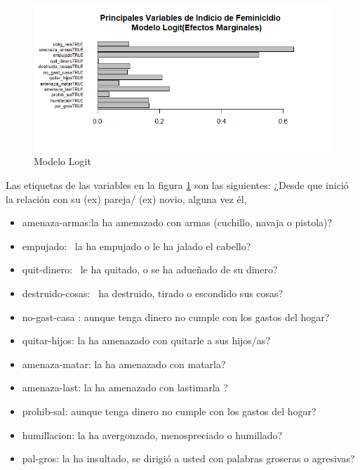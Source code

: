 \documentclass[11pt,letter]{article}
\begin{document}
\begin{figure}[!htp]
\includegraphics[scale=0.7]{log2.png}
\caption{Modelo Logit}
\label{f1_log}
\end{figure}

Las etiquetas de las variables en la figura \ref{f1_log} son las siguientes:
¿Desde que inició la relación con su (ex) pareja/ (ex) novio, alguna vez él,						

\begin{itemize}
    item oblig-rela:  ha usado la fuerza física para obligarla a tener relaciones sexuales?
    \item amenaza-armas:la ha amenazado con armas (cuchillo, navaja o pistola)?
    \item empujado:  la ha empujado o le ha jalado el cabello?
    \item quit-dinero:  le ha quitado, o se ha adueñado de su dinero?
    \item destruido-cosas:  ha destruido, tirado o escondido sus cosas?
    \item no-gast-casa : aunque tenga dinero no cumple con los gastos del hogar?
    \item quitar-hijos:  la ha amenazado con quitarle a sus hijos/as?
    \item amenaza-matar:  la ha amenazado con matarla?
    \item amenaza-last: la ha amenazado con lastimarla ?
    \item prohib-sal: aunque tenga dinero no cumple con los gastos del hogar?
    \item humillacion: la ha avergonzado, menospreciado o humillado?
    \item pal-gros: la ha insultado, se dirigió a usted con palabras groseras o agresivas?
    
\end{itemize}
\end{document}
